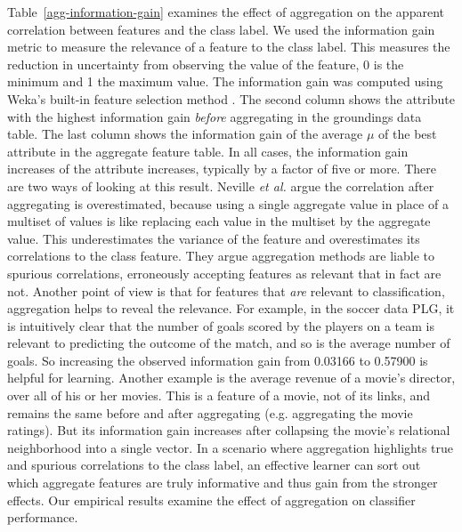 \documentclass[conference]{IEEEtran}
\begin{document}
Table~\ref{agg-information-gain} examines the effect of aggregation on the apparent correlation between features and the class label. We used the information gain metric to measure the relevance of a feature to the class label. This measures the reduction in uncertainty from observing the value of the feature, 0 is the minimum and 1 the maximum value. The information gain was computed using Weka's built-in feature selection method \cite{Hall2009}. The second column shows the attribute with the highest information gain {\em before} aggregating in the groundings data table. The last column  shows the information gain of the average $\mu$ of the best attribute in the aggregate feature table. In all cases, the information gain increases of the attribute increases, typically by a factor of five or more. There are two ways of looking at this result. Neville {\em et al.} \cite{Jensen2003,jensen-auto,Neville2003} argue the correlation after aggregating is overestimated, because using a single aggregate value in place of a multiset of values is like replacing each value in the multiset by the aggregate value. This underestimates the variance of the feature and overestimates its correlations to the class feature. They argue aggregation methods are liable to spurious correlations, erroneously accepting features as relevant that in fact are not. Another point of view is that for features that {\em are} relevant to classification, aggregation helps to reveal the relevance. For example, in the soccer data PLG, it is intuitively clear that the number of goals scored by the players on a team is relevant to predicting the outcome of the match, and so is the average number of goals. So increasing the observed information gain from 0.03166 to 0.57900 is helpful for learning. Another example is the average revenue of a movie's director, over all of his or her movies. This is a feature of a movie, not of its links, and remains the same before and after aggregating (e.g. aggregating the movie ratings). But its information gain increases after collapsing the movie's relational neighborhood into a single vector. In a scenario where aggregation highlights true and spurious correlations to the class label, an effective learner can sort out which aggregate features are truly informative and thus gain from the stronger effects. Our empirical results examine the effect of aggregation on classifier performance.
\end{document}
